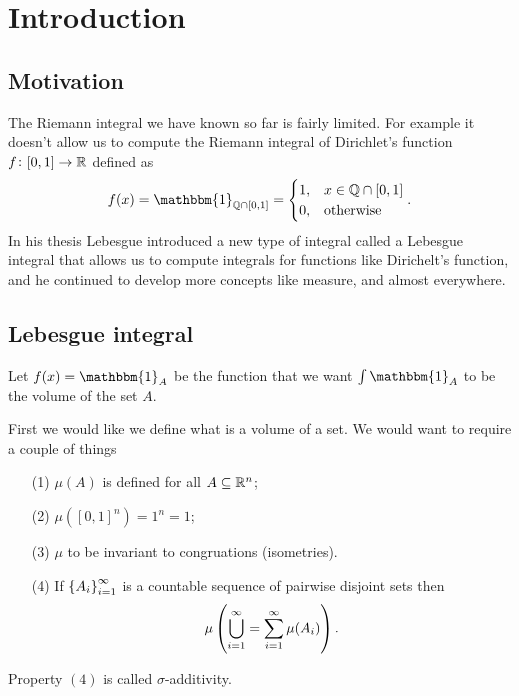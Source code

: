 \documentclass[11pt,a4paper]{article}
\begin{document}
\maketitle


\newpage
\tableofcontents
\newpage

\section{Introduction}

\subsection{Motivation}
The Riemann integral we have known so far is fairly limited.
For example it doesn't allow us to compute the Riemann integral
of Dirichlet's function $f \colon [0,1] \to \mathbb{R}$ defined as
\[
  f(x) = \mathbbm{1}_{\Q \cap [0,1]} =
  \begin{cases}
    1, &x \in \Q \cap [0,1] \\
    0, &\text{otherwise}
  \end{cases}.
\]
In his thesis Lebesgue introduced a new type of integral called
a Lebesgue integral that allows us to compute integrals for functions
like Dirichelt's function, and he continued to develop more concepts
like measure, and almost everywhere.

\subsection{Lebesgue integral}
Let $f(x) = \mathbbm{1}_A$ be the function that 
we want $\int \mathbbm{1}_A$ to be the volume of the set $A$.

First we would like we define what is a volume of a set.
We would want to require a couple of things
\begin{enumerate}
  \item[(1)] $\mu(A)$ is defined for all $A \subseteq \mathbb{R}^n$;
  \item[(2)] $\mu([0,1]^n) = 1^n = 1$;
  \item[(3)] $\mu$ to be invariant to congruations (isometries).
  \item[(4)] If $\set{A_i}_{i=1}^{\infty}$ is a countable sequence
    of pairwise disjoint sets then
    \[
      \mu\del{\bigcup_{i=1}^{\infty} = \sum_{i=1}^{\infty} \mu(A_i)}.
    \]
\end{enumerate}

\begin{remark}
  Property $(4)$ is called $\sigma$-additivity.
\end{remark}
\end{document}
